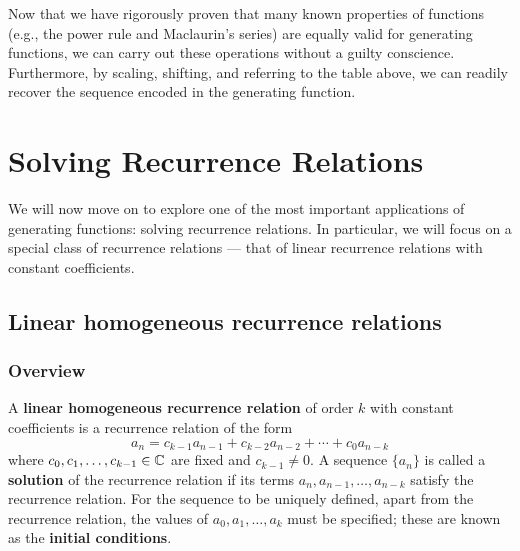 \documentclass[a4paper, 12pt]{report}
\begin{document}
Now that we have rigorously proven that many known properties of functions (e.g., the power rule and Maclaurin's series) are equally valid for generating functions, we can carry out these operations without a guilty conscience. Furthermore, by scaling, shifting, and referring to the table above, we can readily recover the sequence encoded in the generating function.





{\chapter{Solving Recurrence Relations}\label{ch:recurrence}}
We will now move on to explore one of the most important applications of generating functions: solving recurrence relations. In particular, we will focus on a special class of recurrence relations --- that of linear recurrence relations with constant coefficients.

\section{Linear homogeneous recurrence relations}
\subsection{Overview}
\begin{defn}\label{def:lin-homo-recur}
A \textbf{linear homogeneous recurrence relation} of order $k$ with constant coefficients is a recurrence relation of the form \[a_n = c_{k - 1} a_{n - 1} + c_{k - 2} a_{n - 2} + \cdots + c_0 a_{n - k}\]
where $c_0, c_1, \dots, c_{k - 1} \in \mathbb{C}$ are fixed and $c_{k - 1} \neq 0$.
A sequence $\{a_n\}$ is called a \textbf{solution} of the recurrence relation if its terms $a_n, a_{n - 1}, \dots, a_{n - k}$ satisfy the recurrence relation. For the sequence to be uniquely defined, apart from the recurrence relation, the values of $a_0, a_1, \dots, a_k$ must be specified; these are known as the \textbf{initial conditions}.
\end{defn}
\end{document}
